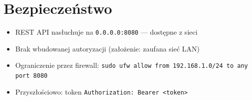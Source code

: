 \documentclass[a4paper,12pt]{article}
\begin{document}
\section{Bezpieczeństwo}

\begin{itemize}[nosep]
\item REST API nasłuchuje na \texttt{0.0.0.0:8080} — dostępne z sieci
\item Brak wbudowanej autoryzacji (założenie: zaufana sieć LAN)
\item Ograniczenie przez firewall: \texttt{sudo ufw allow from 192.168.1.0/24 to any port 8080}
\item Przyszłościowo: token \texttt{Authorization: Bearer <token>}
\end{itemize}

\vfill
\begin{center}
\end{center}
\end{document}
